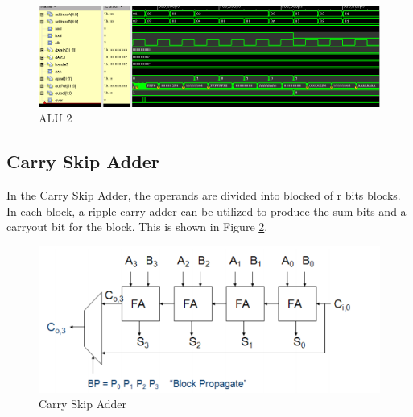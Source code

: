 \documentclass[12pt]{article}
\begin{document}
\begin{figure}[H]
\centering
\includegraphics[width=\linewidth]{../CLA/alu2}
\caption{ALU 2}
\label{fig:alu2-CLA}
\end{figure}



\subsection{Carry Skip Adder}
In the Carry Skip Adder, the operands are divided into blocked of r bits blocks. In each block, a ripple carry adder can be utilized to produce the sum bits and a carryout bit for the block. This is shown in Figure \ref{fig:carry-skip}.

\begin{figure}[H]
\centering
\includegraphics[width=0.7\linewidth]{carry-skip}
\caption{Carry Skip Adder}
\label{fig:carry-skip}
\end{figure}
\end{document}
